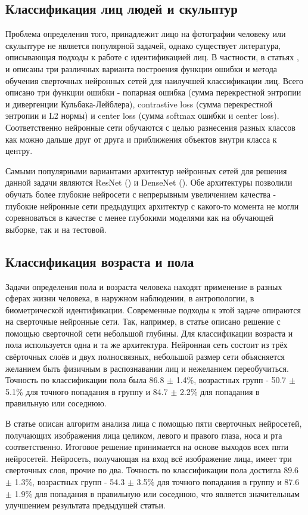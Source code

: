 \documentclass[a4paper,14pt]{extarticle}
\begin{document}
    \subsection{Классификация лиц людей и скульптур}
    Проблема определения того, принадлежит лицо на фотографии человеку или скульптуре не является популярной задачей, однако существует литература, описывающая подходы к работе с идентификацией лиц. В частности, в статьях \cite{pfid}, \cite{pfid2} и \cite{pfid3} описаны три различных варианта построения функции ошибки и метода обучения сверточных нейронных сетей для наилучшей классификации лиц. Всего описано три функции ошибки - попарная ошибка (сумма перекрестной энтропии и дивергенции Кульбака-Лейблера), contrastive loss (сумма перекрестной энтропии и L2 нормы) и center loss (сумма softmax ошибки и center loss). Соответственно нейронные сети обучаются с целью разнесения разных классов как можно дальше друг от друга и приближения объектов внутри класса к центру.
    \par Самыми популярными вариантами архитектур нейронных сетей для решения данной задачи являются ResNet (\cite{resnet}) и DenseNet (\cite{densenet}). Обе архитектуры позволили обучать более глубокие нейросети с непрерывным увеличением качества - глубокие нейронные сети предыдущих архитектур с какого-то момента не могли соревноваться в качестве с менее глубокими моделями как на обучающей выборке, так и на тестовой.
    \subsection{Классификация возраста и пола}
    \par Задачи определения пола и возраста человека находят применение в разных сферах жизни человека, в наружном наблюдении, в антропологии, в биометрической идентификации. Современные подходы к этой задаче опираются на сверточные нейронные сети. Так, например, в статье \cite{hassner} описано решение с помощью сверточной сети небольшой глубины. Для классификации возраста и пола используется одна и та же архитектура. Нейронная сеть состоит из трёх свёрточных слоёв и двух полносвязных, небольшой размер сети объясняется желанием быть физичным в распознавании лиц и нежеланием переобучиться. Точность по классификации пола была 86.8 $\pm$ 1.4\%, возрастных групп - 50.7 $\pm$ 5.1\% для точного попадания в группу и 84.7 $\pm$ 2.2\% для попадания в правильную или соседнюю.
    \par В статье \cite{INDIA} описан алгоритм анализа лица с помощью пяти сверточных нейросетей, получающих изображения лица целиком, левого и правого глаза, носа и рта соответственно. Итоговое решение принимается на основе выходов всех пяти нейросетей. Нейросеть, получающая на вход всё изображение лица, имеет три сверточных слоя, прочие по два. Точность по классификации пола достигла 89.6 $\pm$ 1.3\%, возрастных групп - 54.3 $\pm$ 3.5\% для точного попадания в группу и 87.6 $\pm$ 1.9\% для попадания в правильную или соседнюю, что является значительным улучшением результата предыдущей статьи.
    \newpage
\end{document}
